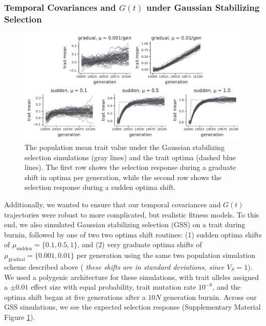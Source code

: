 \documentclass[11pt]{article}
\newcommand{\vb}[1]{{\it \color{blue} #1}}
\begin{document}


\subsubsection{Temporal Covariances and $G(t)$ under Gaussian Stabilizing Selection}

\begin{figure}[!ht]
  \centering
  \includegraphics[width=\textwidth]{figures/gss-zbar.pdf}

  \caption{The population mean trait value under the Gaussian stabilizing
  selection simulations (gray lines) and the trait optima (dashed blue lines).
  The first row shows the selection response during a graduate shift in optima
  per generation, while the second row shows the selection response during a
  sudden optima shift.}

  \label{suppfig:gss-zbar}
\end{figure}

Additionally, we wanted to ensure that our temporal covariances and $G(t)$
trajectories were robust to more complicated, but realistic fitness models. To
this end, we also simulated Gaussian stabilizing selection (GSS) on a trait
during burnin, followed by one of two two optima shift routines: (1) sudden
optima shifts of $\mu_\text{sudden} = \{0.1, 0.5, 1\}$, and (2) very graduate
optima shifts of $\mu_\text{gradual} = \{0.001, 0.01\}$ per generation using
the same two population simulation scheme described above (\vb{these shifts are
in standard deviations, since $V_S = 1$}).  We used a polygenic architecture
for these simulations, with trait alleles assigned a $\pm 0.01$ effect size
with equal probability, trait mutation rate $10^{-8}$, and the optima shift
began at five generations after a $10N$ generation burnin.  Across our GSS
simulations, we see the expected selection response (Supplementary Material
Figure \ref{suppfig:gss-zbar}).
\end{document}

